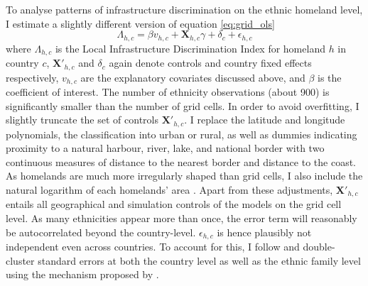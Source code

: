 \documentclass[11pt, oneside]{article}   	%
\begin{document}
To analyse patterns of infrastructure discrimination on the ethnic homeland level, I estimate a slightly different version of equation \eqref{eq:grid_ols}
\begin{equation}
  \Lambda_{h,c} = \beta v_{h,c} + \textbf{X}_{h,c}\gamma + \delta_{c} + \epsilon_{h,c}
  \label{eq:ethn_ols}
\end{equation}
where $\Lambda_{h,c}$ is the Local Infrastructure Discrimination Index for homeland $h$ in country $c$, $\textbf{X}'_{h,c}$ and $\delta_{c}$ again denote controls and country fixed effects respectively, $v_{h,c}$ are the explanatory covariates discussed above, and $\beta$ is the coefficient of interest. The number of ethnicity observations (about 900) is significantly smaller than the number of grid cells. In order to avoid overfitting, I slightly truncate the set of controls $\textbf{X}'_{h,c}$. I replace the latitude and longitude polynomials, the classification into urban or rural, as well as dummies indicating proximity to a natural harbour, river, lake, and national border with two continuous measures of distance to the nearest border and distance to the coast. As homelands are much more irregularly shaped than grid cells, I also include the natural logarithm of each homelands' area \citep[as in][]{Michalopoulos_LongRunEffectsScramble_2016}. Apart from these adjustments, $\textbf{X}'_{h,c}$ entails all geographical and simulation controls of the models on the grid cell level. As many ethnicities appear more than once, the error term will reasonably be autocorrelated beyond the country-level. $\epsilon_{h,c}$ is hence plausibly not independent even across countries. To account for this, I follow \cite{Michalopoulos_LongRunEffectsScramble_2016} and double-cluster standard errors at both the country level as well as the ethnic family level using the mechanism proposed by \cite{Cameron_RobustInferenceMultiway_2011}.
\end{document}

